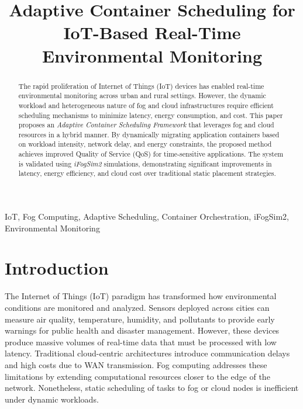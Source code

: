 \documentclass[conference]{IEEEtran}
\begin{document}
	
	\title{Adaptive Container Scheduling for IoT-Based Real-Time Environmental Monitoring}
	
	\author{
		}
	
	\maketitle
	\begin{abstract}
		The rapid proliferation of Internet of Things (IoT) devices has enabled real-time environmental monitoring across urban and rural settings. However, the dynamic workload and heterogeneous nature of fog and cloud infrastructures require efficient scheduling mechanisms to minimize latency, energy consumption, and cost. This paper proposes an \textit{Adaptive Container Scheduling Framework} that leverages fog and cloud resources in a hybrid manner. By dynamically migrating application containers based on workload intensity, network delay, and energy constraints, the proposed method achieves improved Quality of Service (QoS) for time-sensitive applications. The system is validated using \textit{iFogSim2} simulations, demonstrating significant improvements in latency, energy efficiency, and cloud cost over traditional static placement strategies.
	\end{abstract}
	
	\begin{IEEEkeywords}
		IoT, Fog Computing, Adaptive Scheduling, Container Orchestration, iFogSim2, Environmental Monitoring
	\end{IEEEkeywords}
	
	\section{Introduction}
	The Internet of Things (IoT) paradigm has transformed how environmental conditions are monitored and analyzed. Sensors deployed across cities can measure air quality, temperature, humidity, and pollutants to provide early warnings for public health and disaster management. However, these devices produce massive volumes of real-time data that must be processed with low latency. Traditional cloud-centric architectures introduce communication delays and high costs due to WAN transmission. Fog computing addresses these limitations by extending computational resources closer to the edge of the network. Nonetheless, static scheduling of tasks to fog or cloud nodes is inefficient under dynamic workloads.
	
\end{document}
